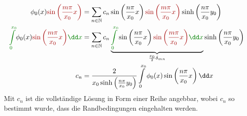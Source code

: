 		        \begin{equation}\begin{split}
				        \phi_0(x) \textcolor{red}{\sin\left( \frac{m\pi}{x_0} x \right)} &= \sum_{n\in\mathbb{N}} c_n \sin\left( \frac{n\pi}{x_0} x \right) \textcolor{red}{\sin\left( \frac{m\pi}{x_0} x \right)} \sinh\left( \frac{n\pi}{x_0} y_0 \right) \\
				        \textcolor{green}{\int\limits_0^{x_0}} \phi_0(x) \textcolor{red}{\sin\left( \frac{m\pi}{x_0} x \right)} \textcolor{green}{\dd x} &=
				        \sum_{n\in\mathbb{N}} c_n \underbrace{\textcolor{green}{\int\limits_0^{x_0}} \sin\left( \frac{n\pi}{x_0} x \right) \textcolor{red}{\sin\left( \frac{m\pi}{x_0} x \right)} \textcolor{green}{\dd x}}_{\frac{x_0}{2}\delta_{mn}} \sinh\left( \frac{n\pi}{x_0} y_0 \right) \\
				        c_n &= \frac{2}{x_0 \sinh\left( \frac{n\pi}{x_0} y_0 \right)}  \int\limits_0^{x_0} \phi_0(x) \sin\left( \frac{n\pi}{x_0} x \right) \dd x
			        \end{split}\end{equation}
		        Mit $c_n$ ist die vollständige Lösung in Form einer Reihe angebbar, wobei $c_n$ so bestimmt wurde, dass die Randbedingungen eingehalten werden.
